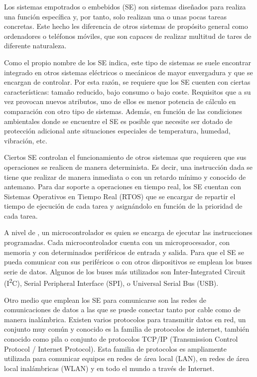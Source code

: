 \label{ch:introduccion}
Los sistemas empotrados o embebidos (SE) son sistemas diseñados para realiza una
función específica y, por tanto, solo realizan una o unas pocas tareas
concretas. Este hecho les diferencia de otros sistemas de propósito general como
ordenadores o teléfonos móviles, que son capaces de realizar multitud de tares
de diferente naturaleza. 

Como el propio nombre de los SE indica, este tipo de sistemas se suele encontrar
integrado en otros sistemas eléctricos o mecánicos de mayor envergadura y que se
encargan de controlar. Por esta razón, se requiere que los SE cuenten con 
ciertas características: tamaño reducido, bajo consumo o bajo coste. Requisitos
que a su vez provocan nuevos atributos, uno de ellos es menor potencia de
cálculo en comparación con otro tipo de sistemas. Además, en función de las
condiciones ambientales donde se encuentre el SE es posible que necesite ser
dotado de protección adicional ante situaciones especiales de temperatura,
humedad, vibración, etc.

Ciertos SE controlan el funcionamiento de otros sistemas que requieren que sus
operaciones se realicen de manera determinista. Es decir, una instrucción dada
se tiene que realizar de manera inmediata o con un retardo mínimo y conocido de
antemano. Para dar soporte a operaciones en tiempo real, los SE cuentan con
Sistemas Operativos en Tiempo Real (RTOS) que se encargar de repartir el tiempo
de ejecución de cada tarea y asignándolo en función de la prioridad de cada
tarea.

A nivel de , un microcontrolador es quien se encarga de
ejecutar las instrucciones programadas. Cada microcontrolador cuenta con un
microprocesador, con memoria y con determinados periféricos de entrada y salida.
Para que el SE se pueda comunicar con sus periféricos o con otros dispositivos
se emplean los buses serie de datos. Algunos de los buses más utilizados son
Inter-Integrated Circuit (I\textsuperscript{2}C), Serial Peripheral Interface
(SPI), o Universal Serial Bus (USB).

Otro medio que emplean los SE para comunicarse son las redes de comunicaciones
de datos a las que se puede conectar tanto por cable como de manera
inalámbrica. Existen varios protocolos para transmitir datos en red, un conjunto
muy común y conocido es la familia de protocolos de internet, también
conocido como pila o conjunto de protocolos TCP/IP
(Transmission Control Protocol / Internet Protocol). Esta familia de protocolos
es ampliamente utilizada para comunicar equipos en redes de área local (LAN), en
redes de área local inalámbricas (WLAN) y en todo el mundo a través de Internet.

